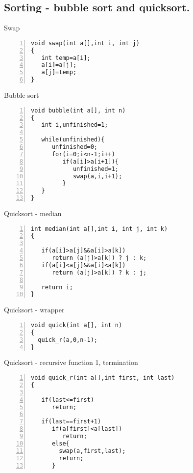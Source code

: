 \documentclass{beamer}
\begin{document}
\subsection*{Sorting - bubble sort and quicksort.}
\begin{frame}[fragile]{Swap}
\begin{lstlisting}[numbers=left]
void swap(int a[],int i, int j)
{
   int temp=a[i];
   a[i]=a[j];
   a[j]=temp;
}
\end{lstlisting}
\end{frame}

\begin{frame}[fragile]{Bubble sort}
\begin{lstlisting}[numbers=left]
void bubble(int a[], int n)
{
   int i,unfinished=1;
  
   while(unfinished){
      unfinished=0;
      for(i=0;i<n-1;i++)
         if(a[i]>a[i+1]){
            unfinished=1;
            swap(a,i,i+1);	    
         }
   }
}
\end{lstlisting}
\end{frame}

\begin{frame}[fragile]{Quicksort - median}
\begin{lstlisting}[numbers=left]
int median(int a[],int i, int j, int k)
{

   if(a[i]>a[j]&&a[i]>a[k])
      return (a[j]>a[k]) ? j : k;
   if(a[i]<a[j]&&a[i]<a[k])
      return (a[j]>a[k]) ? k : j;

   return i;
}
\end{lstlisting}
\end{frame}



\begin{frame}[fragile]{Quicksort - wrapper}
\begin{lstlisting}[numbers=left]
void quick(int a[], int n)
{
  quick_r(a,0,n-1);
}
\end{lstlisting}
\end{frame}

\begin{frame}[fragile]{Quicksort - recursive function 1, termination}
\begin{lstlisting}[numbers=left]
void quick_r(int a[],int first, int last)
{

   if(last<=first)
      return;

   if(last==first+1)
      if(a[first]<a[last])
         return;
      else{
        swap(a,first,last);
        return;
      }
\end{lstlisting}
\end{frame}
\end{document}
